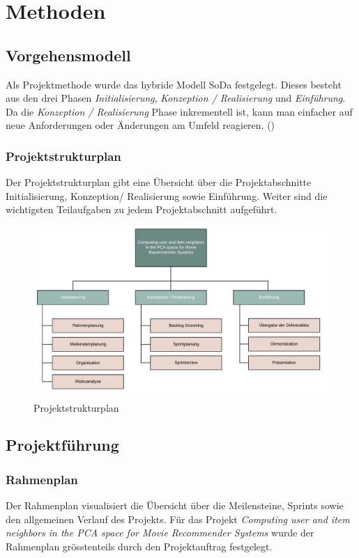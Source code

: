 \chapter{Methoden}

\section{Vorgehensmodell}

Als Projektmethode wurde das hybride Modell SoDa festgelegt. Dieses besteht aus den drei Phasen \textit{Initialisierung}, \textit{Konzeption / Realisierung} und \textit{Einführung}. Da die  \textit{Konzeption / Realisierung} Phase inkrementell ist, kann man einfacher auf neue Anforderungen oder Änderungen am Umfeld reagieren. (\cite{sodawebpage})

\subsection{Projektstrukturplan}
\label{ch:Projektstrukturplan}
Der Projektstrukturplan gibt eine Übersicht über die Projektabschnitte Initialisierung, Konzeption/ Realisierung sowie Einführung. Weiter sind die wichtigsten Teilaufgaben zu jedem Projektabschnitt aufgeführt.
\begin{figure}[htb]
	\centering
	\includegraphics[keepaspectratio,width=\linewidth]{img/Projektstrukturplan.png}
	\caption{Projektstrukturplan}
	\label{fig:Projektstrukturplan}
\end{figure}


\section{Projektführung}

\subsection{Rahmenplan}
Der Rahmenplan visualisiert die Übersicht über die Meilensteine, Sprints sowie den allgemeinen Verlauf des Projekts. Für das Projekt \textit{Computing user and item neighbors in the PCA space for Movie Recommender Systems} wurde der Rahmenplan grösstenteils durch den Projektauftrag festgelegt.

